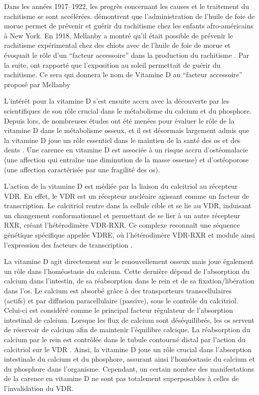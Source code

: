 \documentclass[
  a4paper,
  DIV=11,
  numbers=noendperiod,
  listof=totoc]{scrreprt}
\begin{document}
Dans les années 1917--1922, les progrès concernant les causes et le
traitement du rachitisme se sont accélérées. \textcite{Hess.1917.lc}
démontrent que l'administration de l'huile de foie de morue permet de
prévenir et guérir du rachitisme chez les enfants afro-américains à New
York. En 1918, Mellanby a montré qu'il était possible de prévenir le
rachitisme expérimental chez des chiots avec de l'huile de foie de morue
et évoquait le rôle d'un ``facteur accessoire'' dans la production du
rachitisme \autocite{ORiordan.2014}. Par la suite, \textcite{Hess.1921}
ont rapporté que l'exposition au soleil permettait de guérir du
rachitisme. Ce sera \textcite{McCollum.1922} qui donnera le nom de
Vitamine D au ``facteur accessoire'' proposé par Mellanby
\autocite{Hernigou.2019,Mavrotas.2021}

L'intérêt pour la vitamine D s'est ensuite accru avec la découverte par
les scientifiques de son rôle crucial dans le métabolisme du calcium et
du phosphore. Depuis lors, de nombreuses études ont été menées pour
évaluer le rôle de la vitamine D dans le métabolisme osseux, et il est
désormais largement admis que la vitamine D joue un rôle essentiel dans
le maintien de la santé des os et des dents
\autocite{IOM.2011,Goltzman.2018}. Une carence en vitamine D est
associée à un risque accru d'ostéomalacie (une affection qui entraîne
une diminution de la masse osseuse) et d'ostéoporose (une affection
caractérisée par une fragilité des os).

L'action de la vitamine D est médiée par la liaison du calcitriol au
récepteur \ac{VDR}. En effet, le \ac{VDR} est un récepteur nucléaire
agissant comme un facteur de transcription. Le calcitriol rentre dans la
cellule cible et se lie au \ac{VDR}, induisant un changement
conformationnel et permettant de se lier à un autre récepteur \ac{RXR},
créant l'hétérodimère \ac{VDR}-\ac{RXR}. Ce complexe reconnaît une
séquence génétique spécifique appelée \ac{VDRE}, où l'hétérodimère
\ac{VDR}-\ac{RXR} et module ainsi l'expression des facteurs de
transcription \autocite{Dankers.2017,Pike.2010,Valdivielso.2009}.

La vitamine D agit directement sur le renouvellement osseux mais joue
également un rôle dans l'homéostasie du calcium. Cette dernière dépend
de l'absorption du calcium dans l'intestin, de sa réabsorption dans le
rein et de sa fixation/libération dans l'os. Le calcium est absorbé
grâce à des transporteurs transcellulaires (actifs) et par diffusion
paracellulaire (passive), sous le contrôle du calcitriol. Celui-ci est
considéré comme le principal facteur régulateur de l'absorption
intestinal de calcium. Lorsque les flux de calcium sont déséquilibrés,
les os servent de réservoir de calcium afin de maintenir l'équilibre
calcique. La réabsorption du calcium par le rein est contrôlée dans le
tubule contourné distal par l'action du calcitriol sur le \ac{VDR}
\autocite{Carmeliet.2015}. Ainsi, la vitamine D joue un rôle crucial
dans l'absorption intestinale du calcium et du phosphore, assurant ainsi
l'homéostasie du calcium et du phosphore dans l'organisme. Cependant, un
certain nombre des manifestations de la carence en vitamine D ne sont
pas totalement superposables à celles de l'invalidation du \ac{VDR}.
\end{document}
